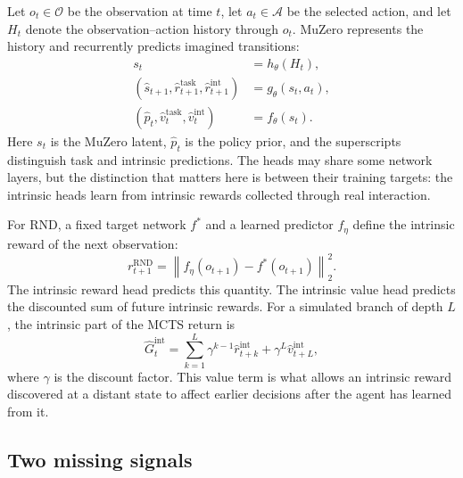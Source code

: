 \documentclass{article}
\begin{document}
Let $o_t\in\mathcal{O}$ be the observation at time $t$, let
$a_t\in\mathcal{A}$ be the selected action, and let $H_t$ denote the
observation--action history through $o_t$. MuZero represents the history and
recurrently predicts imagined transitions:
\begin{align}
    s_t &= h_\theta(H_t), \\
    (\hat{s}_{t+1},\hat{r}^{\mathrm{task}}_{t+1},
      \hat{r}^{\mathrm{int}}_{t+1})
        &= g_\theta(s_t,a_t), \\
    (\hat{p}_t,\hat{v}^{\mathrm{task}}_t,
      \hat{v}^{\mathrm{int}}_t)
        &= f_\theta(s_t).
\end{align}
Here $s_t$ is the MuZero latent, $\hat{p}_t$ is the policy prior, and the
superscripts distinguish task and intrinsic predictions. The heads may share
some network layers, but the distinction that matters here is between their
training targets: the intrinsic heads learn from intrinsic rewards collected
through real interaction.

For RND, a fixed target network $f^\ast$ and a learned predictor $f_\eta$
define the intrinsic reward of the next observation:
\begin{equation}
    r^{\mathrm{RND}}_{t+1}
      = \left\|f_\eta(o_{t+1})-f^\ast(o_{t+1})\right\|_2^2.
\end{equation}
The intrinsic reward head predicts this quantity. The intrinsic value head
predicts the discounted sum of future intrinsic rewards. For a simulated
branch of depth $L$, the intrinsic part of the MCTS return is
\begin{equation}
    \hat{G}^{\mathrm{int}}_t
      = \sum_{k=1}^{L}\gamma^{k-1}
        \hat{r}^{\mathrm{int}}_{t+k}
        +\gamma^L\hat{v}^{\mathrm{int}}_{t+L},
\end{equation}
where $\gamma$ is the discount factor. This value term is what allows an
intrinsic reward discovered at a distant state to affect earlier decisions
after the agent has learned from it.

\subsection{Two missing signals}
\end{document}

